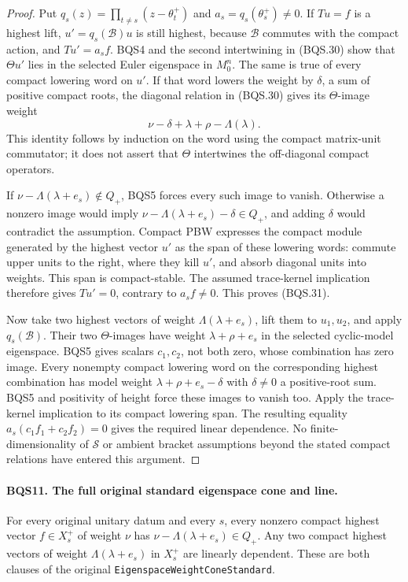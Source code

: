 \begin{proof}
Put $q_s(z)=\prod_{t\ne s}(z-\theta_t^+)$ and
$a_s=q_s(\theta_s^+)\ne0$.
If $Tu=f$ is a highest lift, $u'=q_s(\mathcal B)u$ is still highest,
because $\mathcal B$ commutes with the compact action, and
$Tu'=a_sf$.
BQS4 and the second intertwining in (BQS.30) show that
$\Theta u'$ lies in the selected Euler eigenspace in $M_0^n$.
The same is true of every compact lowering word on $u'$.
If that word lowers the weight by $\delta$, a sum of positive compact
roots, the diagonal relation in (BQS.30) gives its $\Theta$-image
weight
\[
                  \nu-\delta+\lambda+\rho-\Lambda(\lambda).
 \tag{BQS.32}
\]
This identity follows by induction on the word using the compact
matrix-unit commutator; it does not assert that $\Theta$ intertwines
the off-diagonal compact operators.

If $\nu-\Lambda(\lambda+e_s)\notin Q_+$, BQS5 forces every such
image to vanish.  Otherwise a nonzero image would imply
$\nu-\Lambda(\lambda+e_s)-\delta\in Q_+$, and adding $\delta$
would contradict the assumption.  Compact PBW expresses the compact
module generated by the highest vector $u'$ as the span of these
lowering words: commute upper units to the right, where they kill
$u'$, and absorb diagonal units into weights.
This span is compact-stable.  The assumed trace-kernel implication
therefore gives $Tu'=0$, contrary to $a_sf\ne0$.
This proves (BQS.31).

Now take two highest vectors of weight $\Lambda(\lambda+e_s)$,
lift them to $u_1,u_2$, and apply $q_s(\mathcal B)$.
Their two $\Theta$-images have weight $\lambda+\rho+e_s$ in the
selected cyclic-model eigenspace.  BQS5 gives scalars $c_1,c_2$,
not both zero, whose combination has zero image.
Every nonempty compact lowering word on the corresponding highest
combination has model weight $\lambda+\rho+e_s-\delta$ with
$\delta\ne0$ a positive-root sum.  BQS5 and positivity of height
force these images to vanish too.
Apply the trace-kernel implication to its compact lowering span.
The resulting equality
$a_s(c_1f_1+c_2f_2)=0$ gives the required linear dependence.
No finite-dimensionality of $\mathcal S$ or ambient bracket assumptions
beyond the stated compact relations have entered this argument.
\end{proof}

\paragraph{BQS11. The full original standard eigenspace cone and line.}
\label{claim:BQS11}
For every original unitary datum and every $s$, every nonzero compact
highest vector $f\in X_s^+$ of weight $\nu$ has
$\nu-\Lambda(\lambda+e_s)\in Q_+$.
Any two compact highest vectors of weight $\Lambda(\lambda+e_s)$
in $X_s^+$ are linearly dependent.  These are both clauses of the
original \texttt{EigenspaceWeightConeStandard}.


